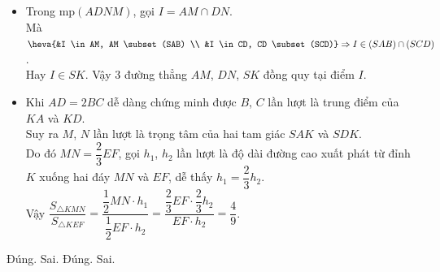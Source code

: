 \begin{ex}
{\begin{itemize}
   Suy ra  tứ giác $EFNM$ là hình thang.
   \item Trong mp$(ADNM)$, gọi $I=AM  \cap DN$.\\
   Mà $\heva{&I  \in AM, AM \subset(SAB) \\ &I \in CD, CD \subset(SCD)} \Rightarrow I \in(SAB) \cap(SCD)$.\\
   Hay $I\in SK$. Vậy 3 đường thẳng $AM$, $DN$, $SK$  đồng quy tại điểm $I$.
   \item Khi $AD=2BC$ dễ dàng chứng minh được $B$, $C$ lần lượt là trung điểm của $KA$ và $KD$.  \\
   Suy ra $M$, $N$ lần lượt là trọng tâm  của hai tam giác $SAK$ và $SDK$.\\
   Do đó $MN=\dfrac{2}{3} EF$, gọi $h_1$, $h_2$ lần lượt là độ dài đường cao xuất phát từ đỉnh $K$ xuống hai đáy  $MN$ và $EF$, dễ thấy $h_1=\dfrac{2}{3} h_2$.\\
   Vậy $\dfrac{S_{\triangle KMN}}{S_{\triangle KEF}}=\dfrac{\dfrac{1}{2} MN \cdot h_1}{\dfrac{1}{2}  EF \cdot h_2}=\dfrac{\dfrac{2}{3} EF \cdot \dfrac{2}{3} h_2}{EF \cdot h_2}=\dfrac{4}{9}$.
  \end{itemize}
  \begin{itemchoice}
   \itemch  Đúng.
   \itemch Sai. 
   \itemch  Đúng.
   \itemch Sai. 
  \end{itemchoice}
  }
\end{ex}



